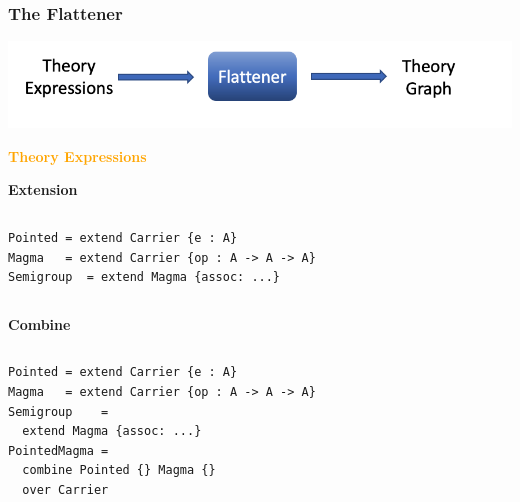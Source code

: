 \documentclass[t,10pt,numbers,fleqn,usenames,xcolor=dvipsnames]{beamer}
\begin{document}
\begin{frame}[fragile] 
\frametitle{The Flattener} 
\begin{center}
\includegraphics[scale=0.2]{figures/flattener.png}
\end{center}

\textcolor{Orange}{\textbf{Theory Expressions}} \vspace{0.2cm}

\begin{overprint}
\textbf{Extension}
\begin{columns}
\begin{column}{0.45\textwidth}
\begin{verbatim}
Pointed = extend Carrier {e : A}
Magma   = extend Carrier {op : A -> A -> A}
Semigroup  = extend Magma {assoc: ...}
\end{verbatim}
\end{column}
\begin{column}{0.45\textwidth}



{\scriptsize
}
\end{column}
\end{columns}

\textbf{Combine}
\begin{columns}
\begin{column}{0.45\textwidth}
\begin{verbatim}
Pointed = extend Carrier {e : A}
Magma   = extend Carrier {op : A -> A -> A}
Semigroup    = 
  extend Magma {assoc: ...}
PointedMagma = 
  combine Pointed {} Magma {} 
  over Carrier
\end{verbatim}
\end{column}
\begin{column}{0.45\textwidth}




\end{column}
\end{columns}
\end{overprint}
\end{frame}
\end{document}
